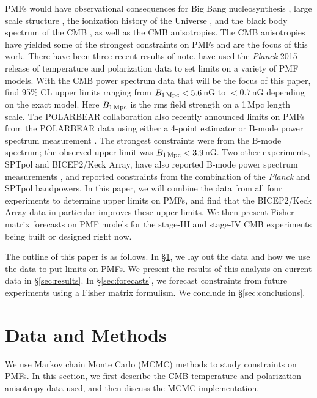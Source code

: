 \documentclass[apj]{emulateapj}
\newcommand{\bpmf}{\ensuremath{B_{\rm 1\,Mpc}}}
\newcommand{\planck}{{\sl Planck}}
\newcommand{\bicepkeck}{BICEP2/Keck Array}
\newcommand{\pb}{POLARBEAR}
\newcommand{\sptpol}{SPTpol}
\begin{document}
PMFs would have observational consequences for Big Bang nucleosynthesis \citep[e.g.,][]{kahniashvili10}, large scale structure \citep[e.g.,][]{battaner97}, the ionization history of the Universe \citep{kunze15}, and the black body spectrum of the CMB \citep[e.g.,][]{kunze14},  as well as the CMB anisotropies. 
The CMB anisotropies have yielded some of the strongest constraints on PMFs and are the focus of this work.
There have been three recent results of note. 
\citet{planck15-19} have used the \planck{} 2015 release of temperature and polarization data to set limits on a variety of PMF models. 
With the CMB power spectrum data that will be the focus of this paper, \citet{planck15-19} find 95\% CL upper limits ranging from $\bpmf < 5.6$\,nG to $<0.7$\,nG depending on the exact model. 
Here \bpmf{} is the rms field strength on a 1\,Mpc length scale. 
The \pb{} collaboration also recently announced limits on PMFs from the \pb{} data using either a 4-point estimator or B-mode power spectrum measurement \citep{polarbear15}. 
The strongest constraints were from the B-mode spectrum; the observed upper limit was $\bpmf < 3.9$\,nG. 
Two other experiments, \sptpol{} and \bicepkeck{}, have also reported B-mode power spectrum measurements \citep{keisler15,bicepkeck15}, 
and \citet{zucca16} reported constraints from the combination of the \planck{}  and \sptpol{} bandpowers. 
In this paper, we will combine the data from all four experiments to determine upper limits on PMFs, and find that the \bicepkeck{} data in particular improves these upper limits. 
We then present Fisher matrix forecasts on PMF models for the stage-III and stage-IV CMB experiments being built or designed right now. 



The outline of this paper is as follows. 
In \S\ref{sec:data}, we lay out the data and how we use the data to put limits on PMFs. 
We present the results of this analysis on current data in \S\ref{sec:results}. 
In \S\ref{sec:forecasts}, we forecast constraints from future experiments using a Fisher matrix formulism. 
We conclude in \S\ref{sec:conclusions}. 

\section{Data and Methods}
\label{sec:data}

We use  Markov chain Monte Carlo (MCMC) methods to study constraints on PMFs. 
In this section, we first describe the CMB temperature and polarization anisotropy data used, and then discuss the MCMC implementation. 
\end{document}
